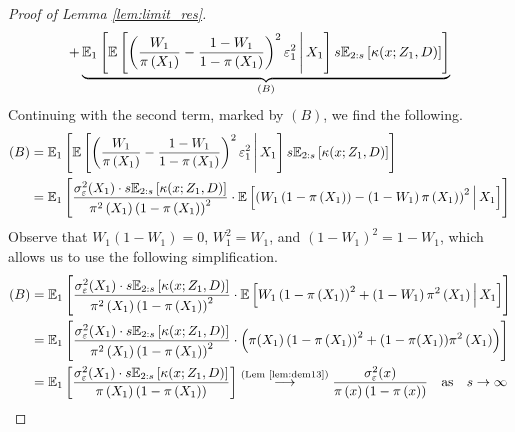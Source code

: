 \begin{proof}[Proof of Lemma \ref{lem:limit_res}]
\begin{equation}
\begin{aligned}
			+ \underbrace{\mathbb{E}_{1}\left[\mathbb{E}\left[\left(\frac{W_{1}}{\pi\left(X_1\right)} - \frac{1 - W_{1}}{1 - \pi\left(X_1\right)}\right)^2 \varepsilon_{1}^2 \, \middle| \, X_1\right] s \mathbb{E}_{2:s}\left[\kappa(x; Z_1, D)\right]\right]}_{(B)}
		\end{aligned}
	\end{equation}
	Continuing with the second term, marked by $(B)$, we find the following.
	\begin{equation}
		\begin{aligned}
			(B) 
			& = \mathbb{E}_{1}\left[\mathbb{E}\left[\left(\frac{W_{1}}{\pi\left(X_1\right)} - \frac{1 - W_{1}}{1 - \pi\left(X_1\right)}\right)^2 \varepsilon_{1}^2 \, \middle| \, X_1\right] s \mathbb{E}_{2:s}\left[\kappa(x; Z_1, D)\right]\right]\\
			& = \mathbb{E}_{1}\left[\frac{\sigma_{\varepsilon}^2(X_1) \cdot s \mathbb{E}_{2:s}\left[\kappa(x; Z_1, D)\right]}{\pi^2\left(X_1\right)\left(1 - \pi\left(X_1\right)\right)^2} \cdot 
			\mathbb{E}\left[\left(W_{1}\left(1 - \pi\left(X_1\right)\right) - \left(1 - W_{1}\right)\pi\left(X_1\right)\right)^2 \, \middle| \, X_1\right] \right]\\
		\end{aligned}
	\end{equation}
	Observe that $W_1(1-W_1) = 0$, $W_1^2 = W_1$, and $(1-W_1)^2 = 1 - W_1$, which allows us to use the following simplification.
	\begin{equation}
		\begin{aligned}
			(B) 
			& = \E_{1}\left[\frac{\sigma_{\varepsilon}^2(X_1) \cdot s \E_{2:s}\left[\kappa(x; Z_1, D)\right]}{\pi^2\left(X_1\right)\left(1 - \pi\left(X_1\right)\right)^2} \cdot 
			\E\left[W_{1}\left(1 - \pi\left(X_1\right)\right)^2 + \left(1 - W_{1}\right)\pi^2\left(X_1\right) \, \middle| \, X_1\right] \right]\\
			& = \E_{1}\left[\frac{\sigma_{\varepsilon}^2(X_1) \cdot s \E_{2:s}\left[\kappa(x; Z_1, D)\right]}{\pi^2\left(X_1\right)\left(1 - \pi\left(X_1\right)\right)^2} \cdot 
			\left(\pi(X_1)\left(1 - \pi\left(X_1\right)\right)^2 + (1 - \pi(X_1))\pi^2\left(X_1\right) \right)\right]\\
			& = \E_{1}\left[\frac{\sigma_{\varepsilon}^2(X_1) \cdot s \E_{2:s}\left[\kappa(x; Z_1, D)\right]}{\pi\left(X_1\right)\left(1 - \pi\left(X_1\right)\right)}\right]
			\overset{\text{(Lem \ref{lem:dem13})}}{\longrightarrow} \frac{\sigma_{\varepsilon}^2(x)}{\pi\left(x\right)\left(1 - \pi\left(x\right)\right)}
			\quad \text{as} \quad s \rightarrow \infty
		\end{aligned}

\end{equation}
\end{proof}
